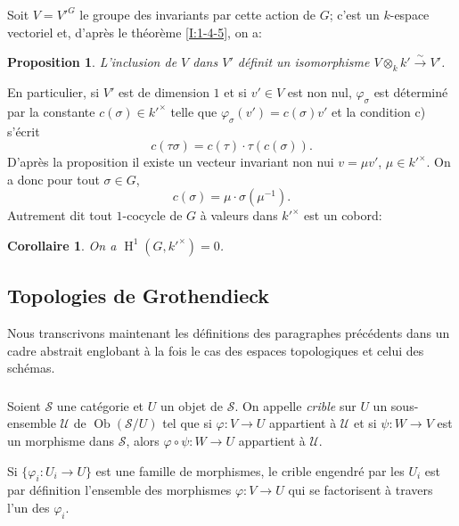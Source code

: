 \documentclass{book}
\DeclareMathOperator{\h}{H}
\DeclareMathOperator{\ob}{Ob}
\newcommand{\sS}{\mathscr{S}}
\newcommand{\sU}{\mathscr{U}}
\newcommand{\iso}{\xrightarrow\sim}
\newtheorem{proposition}[subsubsection]{Proposition}
\newtheorem{corollary}[subsubsection]{Corollaire}
\begin{document}
Soit $V={V'}^G$ le groupe des invariants par cette action de $G$; c'est un 
$k$-espace vectoriel et, d'après le théorème \ref{I:1-4-5}, on a:

\begin{proposition}\label{I:1-5-2}
L'inclusion de $V$ dans $V'$ définit un isomorphisme 
$V\otimes_k k' \iso V'$.
\end{proposition}

En particulier, si $V'$ est de dimension $1$ et si $v'\in V$ est non nul, 
$\varphi_\sigma$ est déterminé par la constante 
$c(\sigma)\in {k'}^\times$ telle que $\varphi_\sigma(v')=c(\sigma)v'$ et la 
condition c) s'écrit 
\[
  c(\tau\sigma) = c(\tau)\cdot \tau(c(\sigma))\text{.}
\]
D'après la proposition il existe un vecteur invariant non nui 
$v=\mu v'$, $\mu\in {k'}^\times$. On a donc pour tout $\sigma\in G$, 
\[
  c(\sigma) = \mu\cdot \sigma(\mu^{-1})\text{.}
\]
Autrement dit tout $1$-cocycle de $G$ à valeurs dans ${k'}^\times$ est un 
cobord: 

\begin{corollary}\label{I:1-5-3}
On a $\h^1(G,{k'}^\times)=0$.
\end{corollary}










\subsection{Topologies de Grothendieck}\label{I:1-6}

Nous transcrivons maintenant les définitions des paragraphes précédents 
dans un cadre abstrait englobant à la fois le cas des espaces topologiques 
et celui des schémas. 





\subsubsection{}\label{I:1-6-1}

Soient $\sS$ une catégorie et $U$ un objet de $\sS$. On appelle \emph{crible} 
sur $U$ un sous-ensemble $\sU$ de $\ob(\sS/U)$ tel que si $\varphi:V\to U$ 
appartient à $\sU$ et si $\psi:W\to V$ est un morphisme dans $\sS$, alors 
$\varphi\circ\psi:W\to U$ appartient à $\sU$. 

Si $\{\varphi_i:U_i\to U\}$ est une famille de morphismes, le crible 
engendré par les $U_i$ est par définition l'ensemble des morphismes 
$\varphi:V\to U$ qui se factorisent à travers l'un des $\varphi_i$. 
\end{document}
